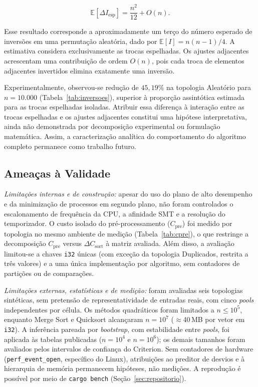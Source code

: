 \documentclass[12pt]{article}
\begin{document}
\[
\mathbb{E}[\Delta I_{\mathrm{esp}}]
=
\frac{n^2}{12}+O(n).
\]

Esse resultado corresponde a aproximadamente um terço do número esperado de inversões em uma permutação aleatória, dado por $\mathbb{E}[I]=n(n-1)/4$. A estimativa considera exclusivamente as trocas espelhadas. Os ajustes adjacentes acrescentam uma contribuição de ordem $O(n)$, pois cada troca de elementos adjacentes invertidos elimina exatamente uma inversão.

Experimentalmente, observou-se redução de $45{,}19\%$ na topologia Aleatório para $n=10.000$ (Tabela~\ref{tab:inversoes}), superior à proporção assintótica estimada para as trocas espelhadas isoladas. Atribuir essa diferença à interação entre as trocas espelhadas e os ajustes adjacentes constitui uma hipótese interpretativa, ainda não demonstrada por decomposição experimental ou formulação matemática. Assim, a caracterização analítica do comportamento do algoritmo completo permanece como trabalho futuro.

\subsection{Ameaças à Validade}\label{sec:ameacas}

\emph{Limitações internas e de construção:} apesar do uso do plano de alto desempenho e da minimização de processos em segundo plano, não foram controlados o escalonamento de frequência da CPU, a afinidade SMT e a resolução do temporizador. O custo isolado do pré-processamento ($C_{\text{pre}}$) foi medido por topologia no mesmo ambiente de medição (Tabela~\ref{tab:cpre}), o que restringe a decomposição $C_{\text{pre}}$ versus $\Delta C_{\text{sort}}$ à matriz avaliada. Além disso, a avaliação limitou-se a chaves \texttt{i32} únicas (com exceção da topologia Duplicados, restrita a três valores) e a uma única implementação por algoritmo, sem contadores de partições ou de comparações.

\emph{Limitações externas, estatísticas e de medição:} foram avaliadas seis topologias sintéticas, sem pretensão de representatividade de entradas reais, com cinco \emph{pools} independentes por célula. Os métodos quadráticos foram limitados a $n\leq10^5$, enquanto Merge Sort e Quicksort alcançaram $n=10^7$ ($\approx$40\,MB por vetor em \texttt{i32}). A inferência pareada por \emph{bootstrap}, com estabilidade entre \emph{pools}, foi aplicada às tabelas publicadas ($n{=}10^4$ e $n{=}10^6$); os demais tamanhos foram avaliados pelos intervalos de confiança do Criterion. Sem contadores de hardware (\texttt{perf\_event\_open}, específico do Linux), atribuições ao preditor de desvios e à hierarquia de memória permanecem hipóteses, não medições. A reprodução é possível por meio de \texttt{cargo bench} (Seção~\ref{sec:repositorio}).
\end{document}
